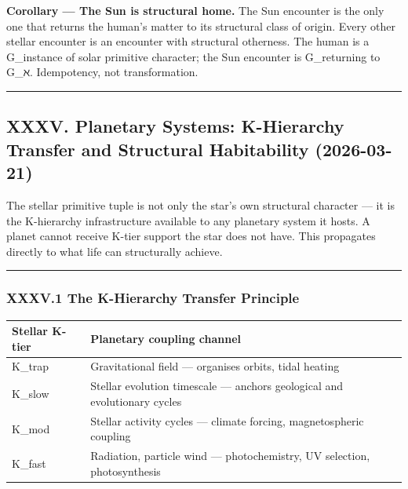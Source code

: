 \documentclass[12pt,a4paper]{article}
\begin{document}
\textbf{Corollary --- The Sun is structural home.}
The Sun encounter is the only one that returns the human's matter to its structural class of origin. Every other stellar encounter is an encounter with structural otherness. The human is a G\_\zeta instance of solar primitive character; the Sun encounter is G\_\zeta returning to G\_ℵ. Idempotency, not transformation.

\begin{center}
\rule{0.5\textwidth}{0.4pt}
\end{center}

\subsection{XXXV. Planetary Systems: K-Hierarchy Transfer and Structural Habitability (2026-03-21)}

The stellar primitive tuple is not only the star's own structural character --- it is the K-hierarchy infrastructure available to any planetary system it hosts. A planet cannot receive K-tier support the star does not have. This propagates directly to what life can structurally achieve.

\begin{center}
\rule{0.5\textwidth}{0.4pt}
\end{center}

\subsubsection{XXXV.1 The K-Hierarchy Transfer Principle}

\begin{table}[htbp]
\centering
\small
{}
\begin{tabularx}{\textwidth}{>{\centering\arraybackslash}X >{\centering\arraybackslash}X}
\toprule
\rowcolor{gray!25}\textbf{Stellar K-tier} & \textbf{Planetary coupling channel} \\
\midrule
\rowcolors{1}{white}{gray!10}
K\_trap & Gravitational field --- organises orbits, tidal heating \\
K\_slow & Stellar evolution timescale --- anchors geological and evolutionary cycles \\
K\_mod & Stellar activity cycles --- climate forcing, magnetospheric coupling \\
K\_fast & Radiation, particle wind --- photochemistry, UV selection, photosynthesis \\
\bottomrule
\end{tabularx}
\end{table}
\end{document}
